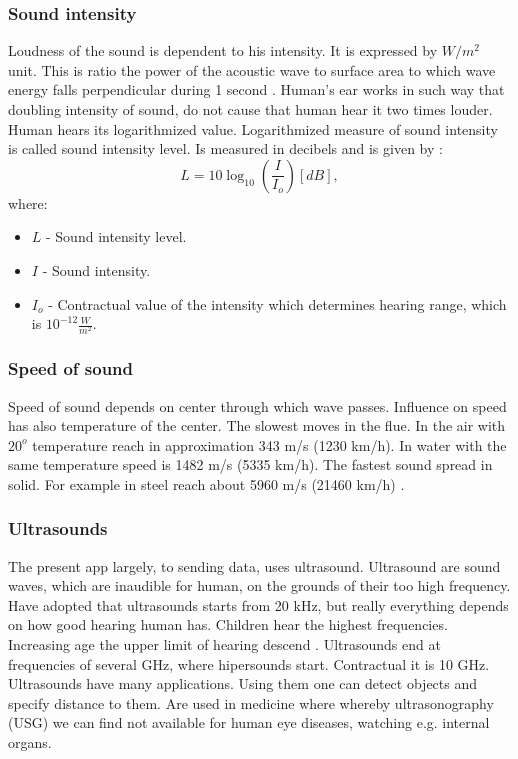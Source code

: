 \documentclass[11pt,titlepage]{article}
\theoremstyle{plain}
\begin{document}
\subsubsection{Sound intensity}
Loudness of the sound is dependent to his intensity. It is expressed by $W/m^2$ unit. This is ratio the power of the acoustic wave to surface area to which wave energy falls perpendicular during 1 second \cite{sound_intensity}. Human's ear works in such way that doubling intensity of sound, do not cause that human hear it two times louder. Human hears its logarithmized value. Logarithmized measure of sound intensity is called sound intensity level. Is measured in decibels and is given by \cite{decibels}:
\begin{equation}
	L = 10\log_{10}(\frac{I}{I_o})  [dB],
\end{equation}
where:
\begin{itemize}
	\item $L$ - Sound intensity level.
	\item $I$ - Sound intensity.
	\item $I_o$ - Contractual value of the intensity which determines hearing range, which is $10^{-12}\frac{W}{m^2}.$
\end{itemize}
\subsubsection{Speed of sound}

Speed of sound depends on center through which wave passes. Influence on speed has also temperature of the center. The slowest moves in the flue. In the air with $20^o$ temperature reach in  approximation 343 m/s (1230 km/h). In water with the same temperature speed is 1482 m/s (5335 km/h). The fastest sound spread in solid. For example in steel reach about 5960 m/s (21460 km/h) \cite{sound_speed}.

\subsubsection{Ultrasounds}
The present app largely, to sending data, uses ultrasound. Ultrasound are sound waves, which are inaudible for human, on the grounds of their too high frequency. Have adopted that ultrasounds starts from 20 kHz, but really everything depends on how good hearing human has. Children hear the highest frequencies. Increasing age the upper limit of hearing descend \cite{limit_sound}. Ultrasounds end at frequencies  of several GHz, where hipersounds start. Contractual it is 10 GHz.  Ultrasounds have many applications. Using them one can detect objects and specify distance to them. Are used in medicine where whereby ultrasonography (USG) we can find not available for human eye diseases, watching e.g. internal organs. 
\end{document}
